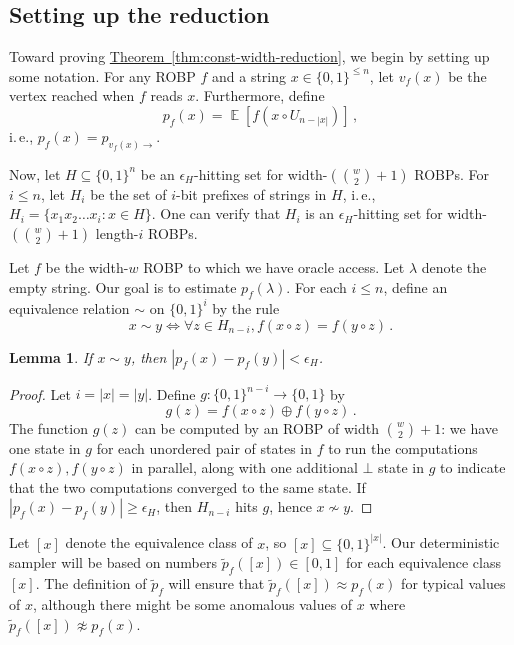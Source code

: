 \documentclass[10pt,a4paper]{article}
\newtheorem{lemma}[theorem]{Lemma}
\DeclareMathOperator*{\ExpVal}{\mathbb E}
\newcommand{\ie}{i.\,e.}
\newcommand{\expref}[2]{\hyperref[#2]{#1~\ref*{#2}}}
\begin{document}
\subsection{Setting up the reduction}
Toward proving \expref{Theorem}{thm:const-width-reduction}, we begin by setting up some notation. For any ROBP $f$ and a string $x \in \{0, 1\}^{\leq n}$, let $v_f(x)$ be the vertex reached when $f$ reads $x$. Furthermore, define
$$
p_f(x) = \ExpVal[f(x \circ U_{n - |x|})]\,,
$$
\ie, $p_f(x) = p_{v_f(x) \to}$.

Now, let $H \subseteq \{0, 1\}^n$ be an $\epsilon_H$-hitting set for width-$(\binom{w}{2} + 1)$ ROBPs. For $i \leq n$, let $H_i$ be the set of $i$-bit prefixes of strings in $H$, \ie, $H_i = \{x_1 x_2 \dots x_i : x \in H\}$. One can verify that $H_i$ is an $\epsilon_H$-hitting set for width-$(\binom{w}{2} + 1)$ length-$i$ ROBPs.

Let $f$ be the width-$w$ ROBP to which we have oracle access. Let $\lambda$ denote the empty string. Our goal is to estimate $p_f(\lambda)$. For each $i \leq n$, define an equivalence relation $\sim$ on $\{0, 1\}^i$ by the rule
$$
x \sim y \iff \forall z \in H_{n - i}, f(x \circ z) = f(y \circ z)\,.
$$
\begin{lemma} \label{lem:equiv}
If $x \sim y$, then $|p_f(x) - p_f(y)| < \epsilon_H$.
\end{lemma}

\begin{proof}
Let $i = |x| = |y|$. Define $g \colon \{0, 1\}^{n - i} \to \{0, 1\}$ by
$$
g(z) = f(x \circ z) \oplus f(y \circ z)\,.
$$
The function $g(z)$ can be computed by an ROBP of width $\binom{w}{2} + 1$: we have one state in $g$ for each unordered pair of states in $f$ to run the computations $f(x \circ z), f(y \circ z)$ in parallel, along with one additional $\bot$ state in $g$ to indicate that the two computations converged to the same state. If $|p_f(x) - p_f(y)| \geq \epsilon_H$, then $H_{n - i}$ hits $g$, hence $x \not \sim y$.
\end{proof}

Let $[x]$ denote the equivalence class of $x$, so $[x] \subseteq \{0, 1\}^{|x|}$. Our deterministic sampler will be based on numbers $\widetilde{p}_f([x]) \in [0, 1]$ for each equivalence class $[x]$. The definition of $\widetilde{p}_f$ will ensure that $\widetilde{p}_f([x]) \approx p_f(x)$ for typical values of $x$, although there might be some anomalous values of $x$ where $\widetilde{p}_f([x]) \not \approx p_f(x)$.
\end{document}
